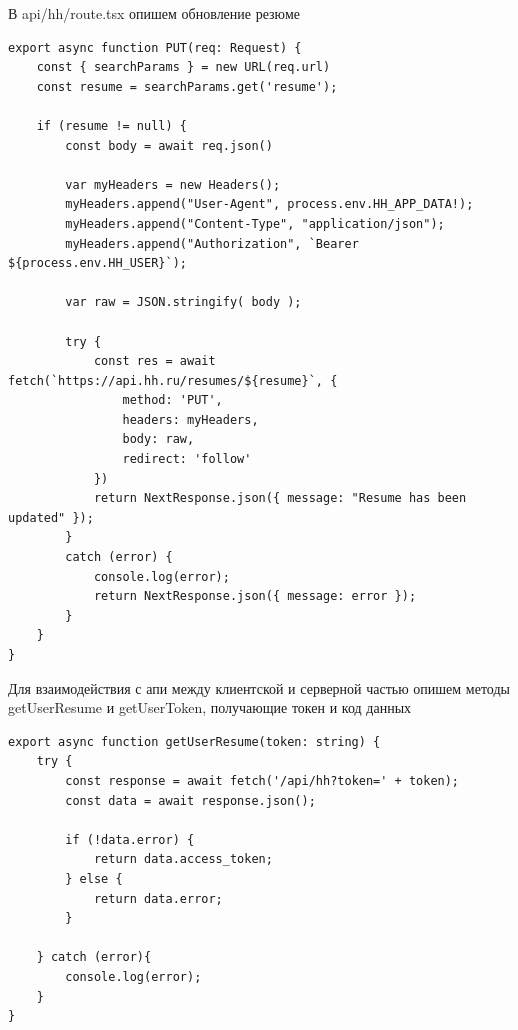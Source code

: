\documentclass[master, och, pract]{SCWorks}
\begin{document}
В api/hh/route.tsx опишем обновление резюме
\begin{verbatim}
export async function PUT(req: Request) {
    const { searchParams } = new URL(req.url)
    const resume = searchParams.get('resume');

    if (resume != null) {
        const body = await req.json()
        
        var myHeaders = new Headers();
        myHeaders.append("User-Agent", process.env.HH_APP_DATA!);
        myHeaders.append("Content-Type", "application/json");
        myHeaders.append("Authorization", `Bearer ${process.env.HH_USER}`);

        var raw = JSON.stringify( body );

        try {
            const res = await fetch(`https://api.hh.ru/resumes/${resume}`, {
                method: 'PUT',
                headers: myHeaders,
                body: raw,
                redirect: 'follow'
            })
            return NextResponse.json({ message: "Resume has been updated" });
        } 
        catch (error) {
            console.log(error);
            return NextResponse.json({ message: error });
        }
    }  
}
\end{verbatim}



Для взаимодействия с апи между клиентской и серверной частью опишем методы getUserResume и 
getUserToken, получающие токен и код данных
\begin{verbatim}
export async function getUserResume(token: string) {
	try {
		const response = await fetch('/api/hh?token=' + token);
		const data = await response.json();

		if (!data.error) {
			return data.access_token;
		} else {
			return data.error;
		}
		
	} catch (error){
		console.log(error);
	}
}
\end{verbatim}
\end{document}
